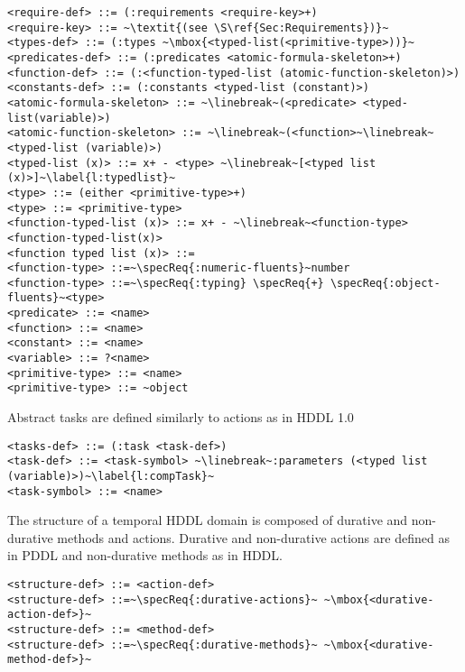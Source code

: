 \documentclass[letterpaper]{article} %
\begin{document}
\begin{lstlisting}[firstnumber=last, escapechar=~]
<require-def> ::= (:requirements <require-key>+)
<require-key> ::= ~\textit{(see \S\ref{Sec:Requirements})}~
<types-def> ::= (:types ~\mbox{<typed-list(<primitive-type>))}~
<predicates-def> ::= (:predicates <atomic-formula-skeleton>+)
<function-def> ::= (:<function-typed-list (atomic-function-skeleton)>)
<constants-def> ::= (:constants <typed-list (constant)>)
<atomic-formula-skeleton> ::= ~\linebreak~(<predicate> <typed-list(variable)>)
<atomic-function-skeleton> ::= ~\linebreak~(<function>~\linebreak~ <typed-list (variable)>)
<typed-list (x)> ::= x+ - <type> ~\linebreak~[<typed list (x)>]~\label{l:typedlist}~
<type> ::= (either <primitive-type>+)
<type> ::= <primitive-type>
<function-typed-list (x)> ::= x+ - ~\linebreak~<function-type> <function-typed-list(x)>
<function typed list (x)> ::=
<function-type> ::=~\specReq{:numeric-fluents}~number
<function-type> ::=~\specReq{:typing} \specReq{+} \specReq{:object-fluents}~<type>
<predicate> ::= <name>
<function> ::= <name>
<constant> ::= <name>
<variable> ::= ?<name>
<primitive-type> ::= <name>
<primitive-type> ::= ~object
\end{lstlisting}

%
%
\noindent Abstract tasks are defined similarly to actions as in HDDL 1.0
\begin{lstlisting}[firstnumber=last, escapechar=~]
<tasks-def> ::= (:task <task-def>)
<task-def> ::= <task-symbol> ~\linebreak~:parameters (<typed list (variable)>)~\label{l:compTask}~
<task-symbol> ::= <name>
\end{lstlisting}

\noindent The structure of a temporal HDDL domain is composed of durative and non-durative methods and actions. Durative and non-durative actions are defined as in PDDL and non-durative methods as in HDDL.

\begin{lstlisting}[firstnumber=last, escapechar=~]
<structure-def> ::= <action-def>
<structure-def> ::=~\specReq{:durative-actions}~ ~\mbox{<durative-action-def>}~
<structure-def> ::= <method-def>
<structure-def> ::=~\specReq{:durative-methods}~ ~\mbox{<durative-method-def>}~
\end{lstlisting}
\end{document}
